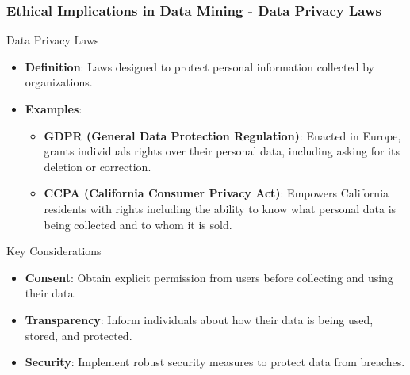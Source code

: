 \documentclass[aspectratio=169]{beamer}
\begin{document}
\begin{frame}[fragile]
    \frametitle{Ethical Implications in Data Mining - Data Privacy Laws}
    \begin{block}{Data Privacy Laws}
        \begin{itemize}
            \item \textbf{Definition}: Laws designed to protect personal information collected by organizations.
            \item \textbf{Examples}:
                \begin{itemize}
                    \item \textbf{GDPR (General Data Protection Regulation)}: 
                    Enacted in Europe, grants individuals rights over their personal data, including asking for its deletion or correction.
                    \item \textbf{CCPA (California Consumer Privacy Act)}: 
                    Empowers California residents with rights including the ability to know what personal data is being collected and to whom it is sold.
                \end{itemize}
        \end{itemize}
    \end{block}
    \begin{block}{Key Considerations}
        \begin{itemize}
            \item \textbf{Consent}: Obtain explicit permission from users before collecting and using their data.
            \item \textbf{Transparency}: Inform individuals about how their data is being used, stored, and protected.
            \item \textbf{Security}: Implement robust security measures to protect data from breaches.
        \end{itemize}
    \end{block}
\end{frame}
\end{document}

